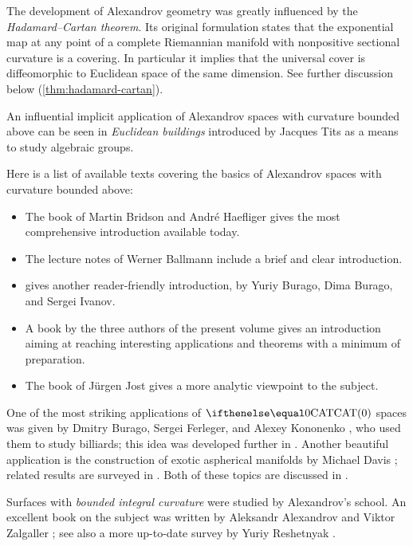 The development of Alexandrov geometry was greatly influenced by the {}\emph{Hadamard--Cartan theorem}.
Its original formulation states that the exponential map at any point of a complete Riemannian manifold with nonpositive sectional curvature is a covering.
In particular it implies that the universal cover is diffeomorphic to Euclidean space of the same dimension. 
See further discussion below (\ref{thm:hadamard-cartan}).

An influential implicit application of Alexandrov spaces with curvature bounded above can be seen in {}\emph{Euclidean buildings} introduced by Jacques Tits as a means to study algebraic groups.


Here is a list of available texts covering the basics of Alexandrov spaces with curvature bounded above: 
\begin{itemize}
\item The book of Martin Bridson and Andr\'e Haefliger \cite{bridson-haefliger} gives the most comprehensive introduction available today. 
\item The lecture notes of Werner Ballmann \cite{ballmann:lectures, ballmann:notes} include a brief 
and clear
introduction.
\item \cite[Chapter 9]{burago-burago-ivanov} gives another reader-friendly introduction, by Yuriy Burago, Dima Burago, and Sergei Ivanov.
\item A book  by the three authors of the present volume  \cite{alexander-kapovitch-petrunin-CAT} gives an introduction aiming at reaching interesting applications and theorems with a minimum of preparation.
\item The book of J\"{u}rgen Jost \cite{jost:book} gives a more analytic viewpoint to the subject.
\end{itemize}

One of the most striking applications of $\CAT0$ spaces was given by Dmitry Burago, Sergei Ferleger, and Alexey Kononenko \cite{burago-ferleger-kononenko1998-1},
who used them to study billiards; this idea was developed further in \cite{burago-ferleger-kononenko1998-2,burago-ferleger-kononenko1998-3,burago-ferleger-kononenko1998-4,burago-ferleger-kononenko2000,burago-ferleger-kononenko2001}. 
Another beautiful application is the construction of exotic aspherical manifolds by Michael Davis \cite{davis:aspherical}; related results are surveyed in \cite{davis:exotic,charney-davis-1995}.
Both of these topics are discussed in \cite{alexander-kapovitch-petrunin-CAT}.

Surfaces with {}\emph{bounded integral curvature} were studied by Alexandrov's school.
An excellent book on the subject was written by Aleksandr Alexandrov and Viktor Zalgaller \cite{aleksandrov-zalgaller}; see also a more up-to-date survey by Yuriy Reshetnyak \cite{reshetnyak:2D}.

